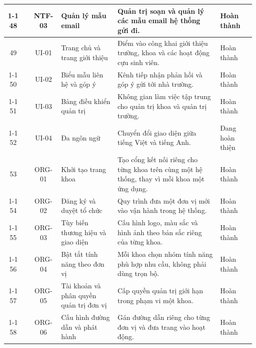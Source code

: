 \documentclass[12pt,a4paper,oneside]{report}
\begin{document}
\begin{longtable}{|c|>{\raggedright\arraybackslash}p{2.5cm}|c|>{\raggedright\arraybackslash}p{3.1cm}|>{\raggedright\arraybackslash}p{5.0cm}|>{\raggedright\arraybackslash}p{1.9cm}|}
\cline{1-1}\cline{3-6}
\cellcolor{oldrow}48 & \multirow{-3}{2.4cm}{\cellcolor{oldrow}\textbf{Thông báo}} & \cellcolor{oldrow}NTF-03 & \cellcolor{oldrow}Quản lý mẫu email & \cellcolor{oldrow}Quản trị soạn và quản lý các mẫu email hệ thống gửi đi. & \cellcolor{oldrow}Hoàn thành \\
\hline
\cellcolor{oldrow}49 & \cellcolor{oldrow} & \cellcolor{oldrow}UI-01 & \cellcolor{oldrow}Trang chủ và trang giới thiệu & \cellcolor{oldrow}Điểm vào công khai giới thiệu trường, khoa và các hoạt động cựu sinh viên. & \cellcolor{oldrow}Hoàn thành \\
\cline{1-1}\cline{3-6}
\cellcolor{oldrow}50 & \cellcolor{oldrow} & \cellcolor{oldrow}UI-02 & \cellcolor{oldrow}Biểu mẫu liên hệ và góp ý & \cellcolor{oldrow}Kênh tiếp nhận phản hồi và góp ý gửi tới nhà trường. & \cellcolor{oldrow}Hoàn thành \\
\cline{1-1}\cline{3-6}
\cellcolor{oldrow}51 & \cellcolor{oldrow} & \cellcolor{oldrow}UI-03 & \cellcolor{oldrow}Bảng điều khiển quản trị & \cellcolor{oldrow}Không gian làm việc tập trung cho quản trị khoa và quản trị trường. & \cellcolor{oldrow}Hoàn thành \\
\cline{1-1}\cline{3-6}
\cellcolor{oldrow}52 & \multirow{-4}{2.4cm}{\cellcolor{oldrow}\textbf{Giao diện công khai}} & \cellcolor{oldrow}UI-04 & \cellcolor{oldrow}Đa ngôn ngữ & \cellcolor{oldrow}Chuyển đổi giao diện giữa tiếng Việt và tiếng Anh. & \cellcolor{oldrow}Đang hoàn thiện \\
\hline
53 &  & ORG-01 & Khởi tạo trang khoa & Tạo cổng kết nối riêng cho từng khoa trên cùng một hệ thống, thay vì mỗi khoa một ứng dụng. & Hoàn thành \\
\cline{1-1}\cline{3-6}
54 &  & ORG-02 & Đăng ký và duyệt tổ chức & Quy trình đưa một đơn vị mới vào vận hành trong hệ thống. & Hoàn thành \\
\cline{1-1}\cline{3-6}
55 &  & ORG-03 & Tùy biến thương hiệu và giao diện & Cấu hình logo, màu sắc và hình ảnh theo bản sắc riêng của từng khoa. & Hoàn thành \\
\cline{1-1}\cline{3-6}
56 &  & ORG-04 & Bật tắt tính năng theo đơn vị & Mỗi khoa chọn nhóm tính năng phù hợp nhu cầu, không phải dùng trọn bộ. & Hoàn thành \\
\cline{1-1}\cline{3-6}
57 &  & ORG-05 & Tài khoản và phân quyền quản trị đơn vị & Cấp quyền quản trị giới hạn trong phạm vi một khoa. & Hoàn thành \\
\cline{1-1}\cline{3-6}
58 & \multirow{-6}{2.4cm}{\textbf{Tổ chức và đa đơn vị}} & ORG-06 & Cấu hình đường dẫn và phát hành & Gán đường dẫn riêng cho từng đơn vị và đưa trang vào hoạt động. & Hoàn thành \\

\end{longtable}
\end{document}
